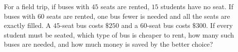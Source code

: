 For a field trip, if buses with $45$ seats are rented, $15$ students have no seat. If buses with $60$ seats are rented, one bus fewer is needed and all the seats are exactly filled. A $45$-seat bus costs $\$250$ and a $60$-seat bus costs $\$300$. If every student must be seated, which type of bus is cheaper to rent, how many such buses are needed, and how much money is saved by the better choice?
